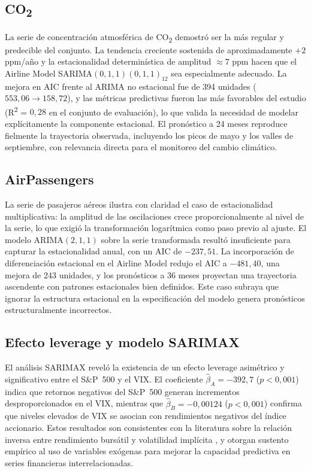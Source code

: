 \documentclass[12pt, a4paper]{article}
\begin{document}
\subsection*{CO\textsubscript{2}}

La serie de concentración atmosférica de CO\textsubscript{2} demostró ser la más regular y predecible del conjunto. La tendencia creciente sostenida de aproximadamente $+2$ ppm/año y la estacionalidad determinística de amplitud $\approx 7$ ppm hacen que el Airline Model SARIMA$(0,1,1)(0,1,1)_{12}$ sea especialmente adecuado. La mejora en AIC frente al ARIMA no estacional fue de 394 unidades ($553{,}06 \to 158{,}72$), y las métricas predictivas fueron las más favorables del estudio (R\textsuperscript{2} = $0{,}28$ en el conjunto de evaluación), lo que valida la necesidad de modelar explícitamente la componente estacional. El pronóstico a 24 meses reproduce fielmente la trayectoria observada, incluyendo los picos de mayo y los valles de septiembre, con relevancia directa para el monitoreo del cambio climático.

\subsection*{AirPassengers}

La serie de pasajeros aéreos ilustra con claridad el caso de estacionalidad multiplicativa: la amplitud de las oscilaciones crece proporcionalmente al nivel de la serie, lo que exigió la transformación logarítmica como paso previo al ajuste. El modelo ARIMA$(2,1,1)$ sobre la serie transformada resultó insuficiente para capturar la estacionalidad anual, con un AIC de $-237{,}51$. La incorporación de diferenciación estacional en el Airline Model redujo el AIC a $-481{,}40$, una mejora de 243 unidades, y los pronósticos a 36 meses proyectan una trayectoria ascendente con patrones estacionales bien definidos. Este caso subraya que ignorar la estructura estacional en la especificación del modelo genera pronósticos estructuralmente incorrectos.

\subsection*{Efecto leverage y modelo SARIMAX}

El análisis SARIMAX reveló la existencia de un efecto leverage asimétrico y significativo entre el S\&P~500 y el VIX. El coeficiente $\hat{\beta}_A = -392{,}7$ ($p < 0{,}001$) indica que retornos negativos del S\&P~500 generan incrementos desproporcionados en el VIX, mientras que $\hat{\beta}_B = -0{,}00124$ ($p < 0{,}001$) confirma que niveles elevados de VIX se asocian con rendimientos negativos del índice accionario. Estos resultados son consistentes con la literatura sobre la relación inversa entre rendimiento bursátil y volatilidad implícita \cite{tsay2010}, y otorgan sustento empírico al uso de variables exógenas para mejorar la capacidad predictiva en series financieras interrelacionadas.
\end{document}
